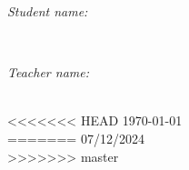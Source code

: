 \begin{titlepage}
    \begin{minipage}[t]{0.4\textwidth}
    \begin{flushleft} \large
    \emph{Student name: }\\
    \studentname
    \end{flushleft}
    \end{minipage}
    ~
    \begin{minipage}[t]{0.4\textwidth}
    \begin{flushright} \Large
    \emph{Teacher name: } \\
    \teachername
    \end{flushright}
    \end{minipage} \\[4.2cm]
<<<<<<< HEAD
    {\large \today} \\[0.4cm]
=======
    {\large 07/12/2024} \\[0.4cm]
>>>>>>> master
    \vfill
    
\end{titlepage}